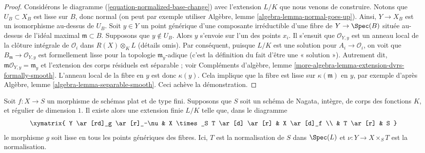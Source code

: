 \begin{proof}
\medskip\noindent
Considérons le diagramme (\ref{equation-normalized-base-change})
avec l'extension $L/K$ que nous venons de construire. Notons que $U_B \subset X_B$
est lisse sur $B$, donc normal (on peut par exemple utiliser
Algèbre, lemme \ref{algebra-lemma-normal-goes-up}).
Ainsi, $Y \to X_B$ est un isomorphisme au-dessus de $U_B$.
Soit $y \in Y$ un point générique d'une composante irréductible
d'une fibre de $Y \to \Spec(B)$ située au-dessus de l'idéal maximal
$\mathfrak m \subset B$. Supposons que $y \not \in U_B$.
Alors $y$ s'envoie sur l'un des points $x_i$. Il s'ensuit que
$\mathcal{O}_{Y, y}$ est un anneau local de la clôture intégrale
de $\mathcal{O}_i$ dans $R(X) \otimes_K L$ (détails omis).
Par conséquent, puisque $L/K$ est une solution pour
$A_i \to \mathcal{O}_i$, on voit que
$B_\mathfrak m \to \mathcal{O}_{Y, y}$ est formellement lisse
pour la topologie $\mathfrak m_y$-adique
(c'est la définition du fait d'être une « solution »).
Autrement dit, $\mathfrak m\mathcal{O}_{Y, y} = \mathfrak m_y$
et l'extension des corps résiduels est séparable ; voir
Compléments d'algèbre, lemme \ref{more-algebra-lemma-extension-dvrs-formally-smooth}.
L'anneau local
de la fibre en $y$ est donc $\kappa(y)$.
Cela implique que la fibre est lisse sur $\kappa(\mathfrak m)$
en $y$, par exemple d'après Algèbre, lemme \ref{algebra-lemma-separable-smooth}.
Ceci achève la démonstration.
\end{proof}

\begin{lemma}
\label{lemma-normalized-base-change-with-reduced-fibre-over-curve}
Soit $f : X \to S$ un morphisme de schémas plat et de type fini.
Supposons que $S$ soit un schéma de Nagata, intègre, de corps des fonctions $K$, et
régulier de dimension $1$. Il existe alors une extension finie $L/K$
telle que, dans le diagramme
$$
\xymatrix{
Y \ar[rd]_g \ar[r]_-\nu & X \times_S T \ar[d] \ar[r] & X \ar[d]_f \\
& T \ar[r] & S
}
$$
le morphisme $g$ soit lisse en tous les points génériques des fibres. Ici,
$T$ est la normalisation de $S$ dans $\Spec(L)$ et $\nu : Y \to X \times_S T$
est la normalisation.
\end{lemma}

